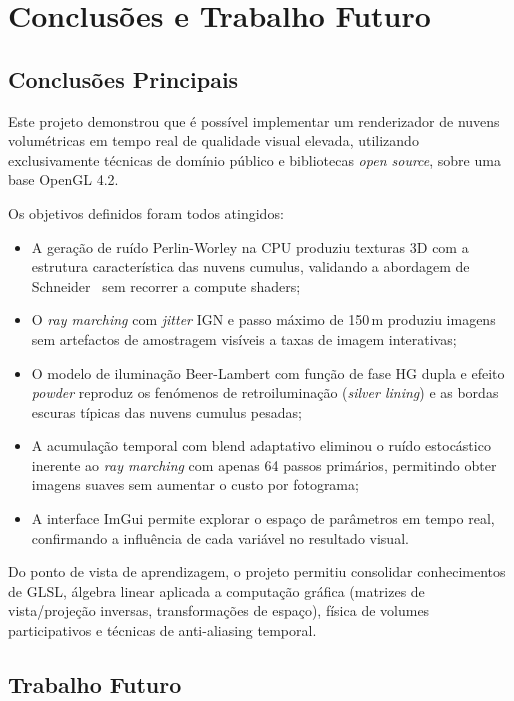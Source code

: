 \chapter{Conclusões e Trabalho Futuro}
\label{chap:conc-trab-futuro}

\section{Conclusões Principais}
\label{sec:conc-princ}

Este projeto demonstrou que é possível implementar um renderizador de nuvens volumétricas em tempo real de qualidade visual elevada, utilizando exclusivamente técnicas de domínio público e bibliotecas \emph{open source}, sobre uma base \ac{OpenGL} 4.2.

Os objetivos definidos foram todos atingidos:

\begin{itemize}
    \item A geração de ruído Perlin-Worley na \ac{CPU} produziu texturas 3D com a estrutura característica das nuvens cumulus, validando a abordagem de Schneider~\cite{schneider2015} sem recorrer a compute shaders;
    \item O \emph{ray marching} com \emph{jitter} IGN e passo máximo de 150\,m produziu imagens sem artefactos de amostragem visíveis a taxas de imagem interativas;
    \item O modelo de iluminação Beer-Lambert com função de fase HG dupla e efeito \emph{powder} reproduz os fenómenos de retroiluminação (\emph{silver lining}) e as bordas escuras típicas das nuvens cumulus pesadas;
    \item A acumulação temporal com blend adaptativo eliminou o ruído estocástico inerente ao \emph{ray marching} com apenas 64 passos primários, permitindo obter imagens suaves sem aumentar o custo por fotograma;
    \item A interface ImGui permite explorar o espaço de parâmetros em tempo real, confirmando a influência de cada variável no resultado visual.
\end{itemize}

Do ponto de vista de aprendizagem, o projeto permitiu consolidar conhecimentos de \ac{GLSL}, álgebra linear aplicada a computação gráfica (matrizes de vista/projeção inversas, transformações de espaço), física de volumes participativos e técnicas de anti-aliasing temporal.

\section{Trabalho Futuro}
\label{sec:trab-futuro}

